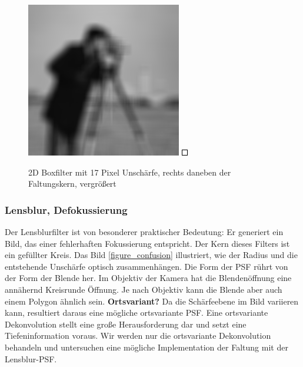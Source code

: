 \documentclass[a4paper,12pt]{article}
\begin{document}
\begin{figure}[htbp]
\centering
\includegraphics[scale=0.8]{box17.png}
\includegraphics[scale=7]{kern2D9mal9.png}
\caption{2D Boxfilter mit 17 Pixel Unschärfe, rechts daneben der Faltungskern,
vergrößert}
\label{figure_motion2d}
\end{figure}


\subsubsection{Lensblur, Defokussierung}
Der Lensblurfilter ist von besonderer praktischer Bedeutung: Er generiert ein
Bild, das einer fehlerhaften Fokussierung entspricht. Der Kern dieses Filters
ist ein gefüllter Kreis. Das Bild \ref{figure_confusion} illustriert, wie der Radius und die
entstehende Unschärfe optisch zusammenhängen. Die Form der PSF rührt von der
Form der Blende her. Im Objektiv der Kamera hat die Blendenöffnung eine
annähernd Kreisrunde Öffnung. Je nach Objektiv kann die Blende aber auch einem
Polygon ähnlich sein.
\textbf{Ortsvariant?} Da die Schärfeebene im Bild variieren kann, resultiert
daraus eine mögliche ortsvariante PSF. Eine ortsvariante Dekonvolution stellt
eine große Herausforderung dar und setzt eine Tiefeninformation voraus.
Wir werden nur die ortsvariante Dekonvolution behandeln und untersuchen 
eine mögliche Implementation der Faltung mit der Lensblur-PSF.
\end{document}
